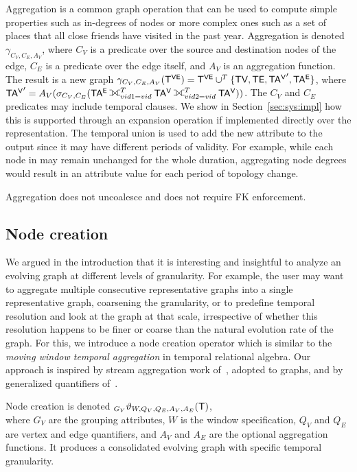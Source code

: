 Aggregation is a common graph operation that can be used to compute
simple properties such as in-degrees of nodes or more complex ones
such as a set of places that all close friends have visited in the
past year.  Aggregation is denoted $\gamma_{C_V,C_E,A_V}$, where $C_V$
is a predicate over the source and destination nodes of the edge,
$C_E$ is a predicate over the edge itself, and $A_V$ is an aggregation
function.  The result is a new graph $\gamma_{C_V,C_E,A_V} (\mathsf{T^{VE}}) =
\mathsf{T^{VE}} \cup^T \{ \textsf{TV}, \textsf{TE}, \mathsf{TA^{V}}', \mathsf{TA^{E}} \}$, where $\tav' =
A_V(\sigma_{C_V,C_E} (\tae \fullouterjoin^T_{vid1=vid} \tav
\fullouterjoin^T_{vid2=vid} \tav))$.  The $C_V$ and $C_E$ predicates
may include temporal clauses.  We show in Section~\ref{sec:sys:impl}
how this is supported through an expansion operation if implemented
directly over the \tve representation.  The temporal union is used to
add the new attribute to the output since it may have different
periods of validity.  For example, while each node in \tg may remain
unchanged for the whole duration, aggregating node degrees would
result in an attribute value for each period of topology change.

Aggregation does not uncoalesce and does not require FK enforcement.

\subsection{Node creation}
\label{sec:algebra:create}

We argued in the introduction that it is interesting and insightful to
analyze an evolving graph at different levels of granularity.  For
example, the user may want to aggregate multiple consecutive
representative graphs into a single representative graph, coarsening
the granularity, or to predefine temporal resolution and look at the
graph at that scale, irrespective of whether this resolution happens
to be finer or coarse than the natural evolution rate of the graph.
For this, we introduce a node creation operator which is similar to
the {\em moving window temporal aggregation} in temporal relational
algebra.  Our approach is inspired by stream aggregation work
of~\cite{Li2005}, adopted to graphs, and by generalized quantifiers
of~\cite{Hsu1995}.

Node creation is denoted $_{G_V}\vartheta_{W,Q_V,Q_E,A_V,A_E}
(\mathsf{T})$,\\ where $G_V$ are the grouping attributes, $W$ is the window
specification, $Q_V$ and $Q_E$ are vertex and edge quantifiers, and
$A_V$ and $A_E$ are the optional aggregation functions.  It produces a
consolidated evolving graph with specific temporal granularity.

